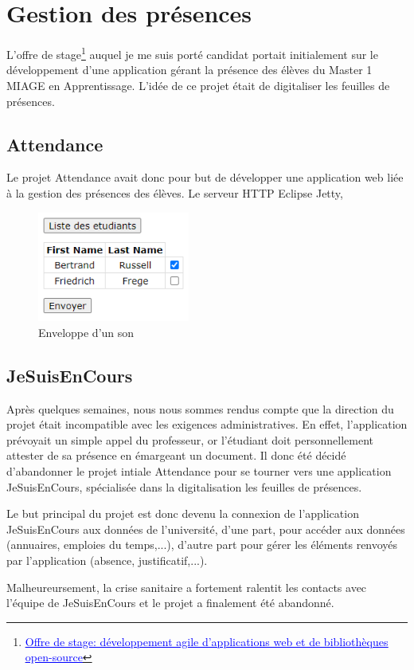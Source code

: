 \chapter[Gestion des présences]{Gestion des présences\raisebox{.3\baselineskip}{\normalsize\footnotemark}}

L'offre de stage\footnote{\href{https://github.com/Dauphine-MIDO/M1-app/blob/master/Stage dev.adoc}{\textcolor{blue}{\underline{Offre de stage: développement agile d’applications web et de bibliothèques open-source}}}} auquel je me suis porté candidat portait initialement sur le développement d'une application gérant la présence des élèves du Master 1 MIAGE en Apprentissage. L'idée de ce projet était de digitaliser les feuilles de présences.

\section{Attendance}

Le projet Attendance avait donc pour but de développer une application web liée à la gestion des présences des élèves. Le serveur HTTP Eclipse Jetty, 

\begin{figure}[!h]
    \begin{center}
    \includegraphics[width=5cm]{assets/attendance.PNG}
    \end{center}
    \caption{Enveloppe d'un son}
\end{figure}

\section{JeSuisEnCours}

Après quelques semaines, nous nous sommes rendus compte que la direction du projet était incompatible avec les exigences administratives. En effet, l'application prévoyait un simple appel du professeur, or l'étudiant doit personnellement attester de sa présence en émargeant un document. Il donc été décidé d'abandonner le projet intiale Attendance pour se tourner vers une application JeSuisEnCours, spécialisée dans la digitalisation les feuilles de présences. 

Le but principal du projet est donc devenu la connexion de l'application JeSuisEnCours aux données de l'université, d'une part, pour accéder aux données (annuaires, emploies du temps,...), d'autre part pour gérer les éléments renvoyés par l'application (absence, justificatif,...).

Malheureursement, la crise sanitaire a fortement ralentit les contacts avec l'équipe de JeSuisEnCours et le projet a finalement été abandonné.